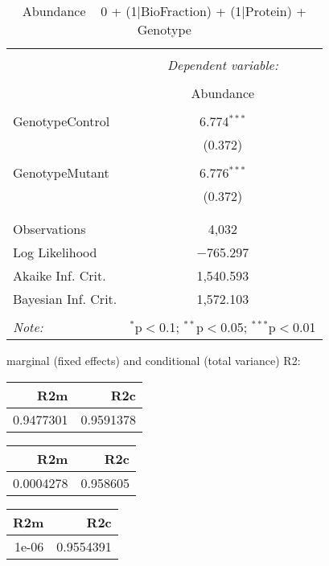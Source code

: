 \documentclass[11pt]{report}
\begin{document}
\begin{table}[!htbp] \centering 
  \caption{Abundance ~ 0 + (1|BioFraction) + (1|Protein) + Genotype} 
  \label{} 
\begin{tabular}{@{\extracolsep{5pt}}lc} 
\\[-1.8ex]\hline 
\hline \\[-1.8ex] 
 & \multicolumn{1}{c}{\textit{Dependent variable:}} \\ 
\cline{2-2} 
\\[-1.8ex] & Abundance \\ 
\hline \\[-1.8ex] 
 GenotypeControl & 6.774$^{***}$ \\ 
  & (0.372) \\ 
  & \\ 
 GenotypeMutant & 6.776$^{***}$ \\ 
  & (0.372) \\ 
  & \\ 
\hline \\[-1.8ex] 
Observations & 4,032 \\ 
Log Likelihood & $-$765.297 \\ 
Akaike Inf. Crit. & 1,540.593 \\ 
Bayesian Inf. Crit. & 1,572.103 \\ 
\hline 
\hline \\[-1.8ex] 
\textit{Note:}  & \multicolumn{1}{r}{$^{*}$p$<$0.1; $^{**}$p$<$0.05; $^{***}$p$<$0.01} \\ 
\end{tabular} 
\end{table} 
marginal (fixed effects) and conditional (total variance) R2:

\begin{tabular}{r|r}
\hline
R2m & R2c\\
\hline
0.9477301 & 0.9591378\\
\hline
\end{tabular}

\begin{tabular}{r|r}
\hline
R2m & R2c\\
\hline
0.0004278 & 0.958605\\
\hline
\end{tabular}

\begin{tabular}{r|r}
\hline
R2m & R2c\\
\hline
1e-06 & 0.9554391\\
\hline
\end{tabular}
\end{document}
